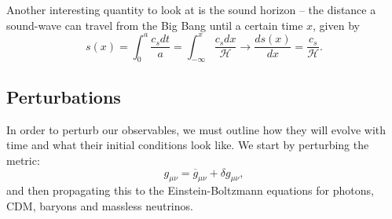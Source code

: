 \documentclass{aa}
\begin{document}
Another interesting quantity to look at is the sound horizon -- the distance a sound-wave can travel from the Big Bang until a certain time $x$, given by
\begin{equation}
    s(x) = \int_0^{a} \frac{c_s dt}{a} = \int_{-\infty}^{x} \frac{c_s dx}{\mathcal{H}} \to \frac{ds(x)}{dx} = \frac{c_s}{\mathcal{H}}.
\end{equation}

\subsection{Perturbations}

In order to perturb our observables, we must outline how they will evolve with time and what their initial conditions look like. We start by perturbing the metric:
\begin{equation}
g_{\mu\nu} = \overline{g}_{\mu\nu} + \delta g_{\mu\nu},
\end{equation}
and then propagating this to the Einstein-Boltzmann equations for photons, CDM, baryons and massless neutrinos.
\end{document}

